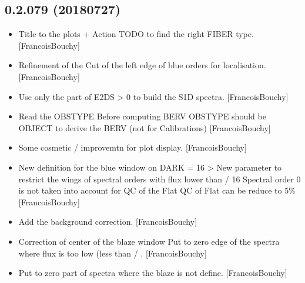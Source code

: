 \documentclass[a4paper,10pt,english]{report}
\begin{document}
\subsection{0.2.079 (2018\sphinxhyphen{}07\sphinxhyphen{}27)}
\label{\detokenize{misc/changelog:id402}}\begin{itemize}
\item {} 
Title to the plots + Action TODO to find the right FIBER type.
{[}FrancoisBouchy{]}

\item {} 
Refinement of the Cut of the left edge of blue orders for
localisation. {[}FrancoisBouchy{]}

\item {} 
Use only the part of E2DS \textgreater{} 0 to build the S1D spectra.
{[}FrancoisBouchy{]}

\item {} 
Read the OBSTYPE Before computing BERV OBSTYPE should be OBJECT to
derive the BERV (not for Calibrations) {[}FrancoisBouchy{]}

\item {} 
Some cosmetic / improvemtn for plot display. {[}FrancoisBouchy{]}

\item {} 
New definition for the blue window on DARK  = 16 \textendash{}\textgreater{}
New parameter to restrict the wings of spectral orders with flux lower
than  / 16 Spectral order 0 is not taken into account for
QC of the Flat QC of Flat can be reduce to 5\% {[}FrancoisBouchy{]}

\item {} 
Add the background correction. {[}FrancoisBouchy{]}

\item {} 
Correction of center of the blaze window Put to zero edge of the
spectra where flux is too low (less than  /
. {[}FrancoisBouchy{]}

\item {} 
Put to zero part of spectra where the blaze is not define.
{[}FrancoisBouchy{]}

\end{itemize}
\end{document}
